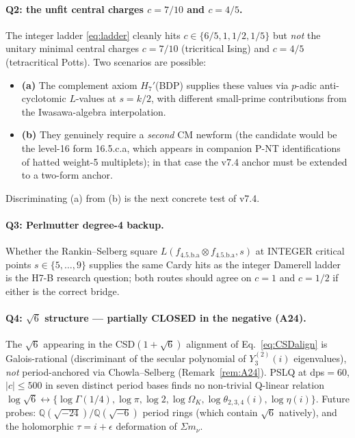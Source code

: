 \documentclass[a4paper,11pt]{article}
\newcommand{\OmK}{\Omega_K}
\newcommand{\fLM}{f_{\text{4.5.b.a}}}
\theoremstyle{definition}
\theoremstyle{remark}
\begin{document}
\paragraph{Q2: the unfit central charges $c=7/10$ and $c=4/5$.}
The integer ladder \eqref{eq:ladder} cleanly hits
$c\in\{6/5,1,1/2,1/5\}$ but \emph{not} the unitary minimal central
charges $c=7/10$ (tricritical Ising) and $c=4/5$ (tetracritical
Potts).  Two scenarios are possible:
\begin{itemize}
  \item\textbf{(a)} The complement axiom $H_7'$(BDP) supplies these
    values via $p$-adic anti-cyclotomic $L$-values at $s=k/2$, with
    different small-prime contributions from the
    Iwasawa-algebra interpolation.
  \item\textbf{(b)} They genuinely require a \emph{second} CM
    newform (the candidate would be the level-16 form 16.5.c.a, which
    appears in companion P-NT identifications of hatted
    weight-5 multiplets); in that case the v7.4 anchor must be
    extended to a two-form anchor.
\end{itemize}
Discriminating (a) from (b) is the next concrete test of v7.4.

\paragraph{Q3: Perlmutter degree-4 backup.}
Whether the Rankin--Selberg square $L(\fLM\otimes\fLM,s)$ at
INTEGER critical points $s\in\{5,\ldots,9\}$ supplies the same Cardy
hits as the integer Damerell ladder is the H7-B research question;
both routes should agree on $c=1$ and $c=1/2$ if either is the
correct bridge.

\paragraph{Q4: $\sqrt 6$ structure --- partially CLOSED in the
negative (A24).}
The $\sqrt 6$ appearing in the CSD$(1+\sqrt 6)$ alignment of
Eq.~\eqref{eq:CSDalign} is Galois-rational (discriminant of the
secular polynomial of $Y_3^{(2)}(i)$ eigenvalues), \emph{not}
period-anchored via Chowla--Selberg (Remark~\ref{rem:A24}).  PSLQ at
dps$=60$, $|c|\le 500$ in seven distinct period bases finds no
non-trivial Q-linear relation $\log\sqrt 6\leftrightarrow
\{\log\Gamma(1/4),\log\pi,\log 2,\log\OmK,\log\theta_{2,3,4}(i),
\log\eta(i)\}$.  Future probes: $\mathbb{Q}(\sqrt{-24})/
\mathbb{Q}(\sqrt{-6})$ period rings (which contain $\sqrt 6$
natively), and the holomorphic $\tau=i+\epsilon$ deformation of
$\Sigma m_\nu$.
\end{document}
